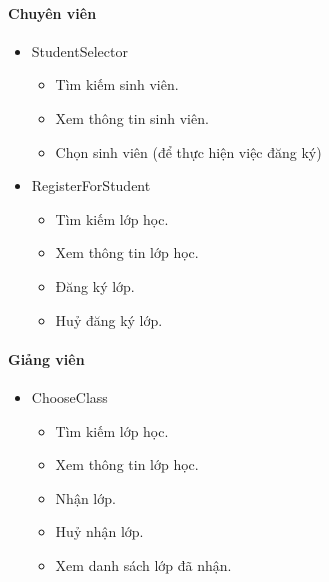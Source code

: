 \documentclass[12pt]{book}
\begin{document}
      \paragraph{Chuyên viên}
      \begin{itemize}
        \item StudentSelector
        \begin{itemize}
          \item Tìm kiếm sinh viên.
          \item Xem thông tin sinh viên.
          \item Chọn sinh viên (để thực hiện việc đăng ký)
        \end{itemize}
        \item RegisterForStudent
        \begin{itemize}
          \item Tìm kiếm lớp học.
          \item Xem thông tin lớp học.
          \item Đăng ký lớp.
          \item Huỷ đăng ký lớp.
        \end{itemize}
      \end{itemize}

      \paragraph{Giảng viên}
      \begin{itemize}
        \item ChooseClass
        \begin{itemize}
          \item Tìm kiếm lớp học.
          \item Xem thông tin lớp học.
          \item Nhận lớp.
          \item Huỷ nhận lớp.
          \item Xem danh sách lớp đã nhận.
        \end{itemize}
      \end{itemize}
\end{document}
